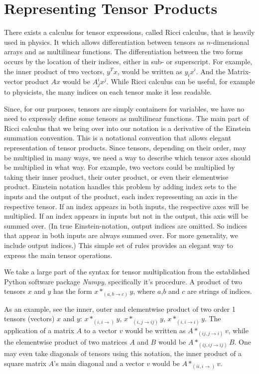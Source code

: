 \documentclass[12pt, a4paper]{report}
\begin{document}
\section{Representing Tensor Products}
There exists a calculus for tensor expressions, called Ricci calculus, that is heavily used in physics.
It which allows differentiation between tensors as $n$-dimensional arrays and as multilinear functions.
The differentiation between the two forms occurs by the location of their indices, either in sub- or superscript.
For example, the inner product of two vectors, $y^Tx$, would be written as $y_ix^i$. And the Matrix-vector product $Ax$ would be $A^i_jx^j$.
While Ricci calculus can be useful, for example to physicists, the many indices on each tensor make it less readable.

Since, for our purposes, tensors are simply containers for variables, we have no need to expressly define some tensors as multilinear functions.
The main part of Ricci calculus that we bring over into our notation is a derivative of the Einstein summation convention.
This is a notational convention that allows elegant representation of tensor products.
Since tensors, depending on their order, may be multiplied in many ways, we need a way to describe which tensor axes should be multiplied in what way.
For example, two vectors could be multiplied by taking their inner product, their outer product, or even their elementwise product.
Einstein notation handles this problem by adding index sets to the inputs and the output of the product, each index representing an axis in the respective tensor.
If an index appears in both inputs, the respective axes will be multiplied.
If an index appears in inputs but not in the output, this axis will be summed over. (In true Einstein-notation, output indices are omitted. So indices that appear in both inputs are always summed over. For more generality, we include output indices.)
This simple set of rules provides an elegant way to express the main tensor operations.

We take a large part of the syntax for tensor multiplication from the established Python software package \textit{Numpy}, specifically it's  procedure.
A product of two tensors $x$ and $y$ has the form $x*_{(a,b \rightarrow c)}y$, where $a$,$b$ and $c$ are strings of indices.

As an example, see the inner, outer and elementwise product of two order 1 tensors (vectors) $x$ and $y$: $x*_{(i,i \rightarrow)}y$, $x*_{(i,j \rightarrow ij)}y$, $x*_{(i,i \rightarrow i)}y$.
The application of a matrix $A$ to a vector $v$ would be written as $A*_{(ij,j \rightarrow i)}v$, while the elementwise product of two matrices $A$ and $B$ would be $A*_{(ij,ij \rightarrow ij)}B$.
One may even take diagonals of tensors using this notation, the inner product of a square matrix $A$'s main diagonal and a vector $v$ would be $A*_{(ii,i \rightarrow)}v$.
\end{document}
